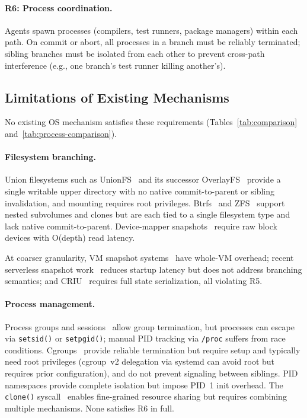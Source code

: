 \documentclass[sigconf]{acmart}
\begin{document}
\paragraph{R6: Process coordination.}
Agents spawn processes (compilers, test runners, package managers) within each path. On commit or abort, all processes in a branch must be reliably terminated; sibling branches must be isolated from each other to prevent cross-path interference (e.g., one branch's test runner killing another's).

\subsection{Limitations of Existing Mechanisms}

No existing OS mechanism satisfies these requirements (Tables~\ref{tab:comparison} and~\ref{tab:process-comparison}).

\paragraph{Filesystem branching.}
Union filesystems such as UnionFS~\cite{unionfs} and its successor OverlayFS~\cite{overlayfs} provide a single writable upper directory with no native commit-to-parent or sibling invalidation, and mounting requires root privileges. Btrfs~\cite{btrfs} and ZFS~\cite{zfs} support nested subvolumes and clones but are each tied to a single filesystem type and lack native commit-to-parent. Device-mapper snapshots~\cite{dmsnapshot} require raw block devices with O(depth) read latency.

At coarser granularity, VM snapshot systems~\cite{qcow2,vmware-snapshots,remus,snowflock} have whole-VM overhead; recent serverless snapshot work~\cite{firecracker,faasnap,catalyzer} reduces startup latency but does not address branching semantics; and CRIU~\cite{criu} requires full state serialization, all violating R5.

\paragraph{Process management.}
Process groups and sessions~\cite{apue} allow group termination, but processes can escape via \texttt{setsid()} or \texttt{setpgid()}; manual PID tracking via \texttt{/proc} suffers from race conditions. Cgroups~\cite{cgroups} provide reliable termination but require setup and typically need root privileges (cgroup~v2 delegation via systemd can avoid root but requires prior configuration), and do not prevent signaling between siblings. PID namespaces provide complete isolation but impose PID~1 init overhead. The \texttt{clone()} syscall~\cite{clone} enables fine-grained resource sharing but requires combining multiple mechanisms. None satisfies R6 in full.
\end{document}
